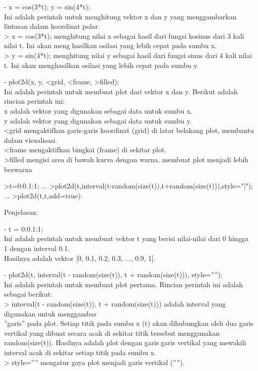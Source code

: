 \documentclass{article}
\begin{document}
\begin{eulernotebook}
\begin{eulercomment}
- x = cos(3*t); y = sin(4*t);\\
Ini adalah perintah untuk menghitung vektor x dan y yang menggambarkan
lintasan dalam koordinat polar.\\
\textgreater{} x = cos(3*t); menghitung nilai x sebagai hasil dari fungsi kosinus
dari 3 kali nilai t. Ini akan menghasilkan osilasi yang lebih cepat
pada sumbu x.\\
\textgreater{} y = sin(4*t); menghitung nilai y sebagai hasil dari fungsi sinus
dari 4 kali nilai t. Ini akan menghasilkan osilasi yang lebih cepat
pada sumbu y.

- plot2d(x, y, \textless{}grid, \textless{}frame, \textgreater{}filled);\\
Ini adalah perintah untuk membuat plot dari vektor x dan y. Berikut
adalah rincian perintah ini:\\
x adalah vektor yang digunakan sebagai data untuk sumbu x.\\
y adalah vektor yang digunakan sebagai data untuk sumbu y.\\
\textless{}grid mengaktifkan garis-garis koordinat (grid) di latar belakang
plot, membantu dalam visualisasi.\\
\textless{}frame mengaktifkan bingkai (frame) di sekitar plot.\\
\textgreater{}filled mengisi area di bawah kurva dengan warna, membuat plot menjadi
lebih berwarna
\end{eulercomment}
\begin{eulerprompt}
>t=0:0.1:1; ...  
>plot2d(t,interval(t-random(size(t)),t+random(size(t))),style="|"); ...
>plot2d(t,t,add=true):
\end{eulerprompt}
\begin{eulercomment}
Penjelasan:

- t = 0:0.1:1;\\
Ini adalah perintah untuk membuat vektor t yang berisi nilai-nilai
dari 0 hingga 1 dengan interval 0.1.\\
Hasilnya adalah vektor [0, 0.1, 0.2, 0.3, ..., 0.9, 1].

- plot2d(t, interval(t - random(size(t)), t + random(size(t))),
style=”\textbar{}”);\\
Ini adalah perintah untuk membuat plot pertama. Rincian perintah ini
adalah sebagai berikut:\\
\textgreater{} interval(t - random(size(t)), t + random(size(t))) adalah interval
yang digunakan untuk menggambar\\
”garis” pada plot. Setiap titik pada sumbu x (t) akan dihubungkan oleh
dua garis vertikal yang dibuat secara acak di sekitar titik tersebut
menggunakan random(size(t)). Hasilnya adalah plot dengan garisgaris
vertikal yang mewakili interval acak di sekitar setiap titik pada
sumbu x.\\
\textgreater{} style=”\textbar{}” mengatur gaya plot menjadi garis vertikal (”\textbar{}”).


\end{eulercomment}
\end{eulernotebook}
\end{document}
